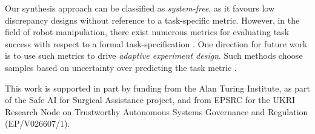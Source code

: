 \documentclass[sigplan, screen]{acmart} %
\begin{document}
Our synthesis approach can be classified as \emph{system-free}, as it favours low discrepancy designs without reference to a task-specific metric. However, in the field of robot manipulation, there exist numerous metrics for evaluating task success with respect to a formal task-specification \cite{mehdipour2019arithmetic, varnai2020robustness, haghighi2019control}. One direction for future work is to use such metrics to drive \emph{adaptive experiment design}. Such methods choose samples based on uncertainty over predicting the task metric \cite{eason2014adaptive}.

\begin{acks}
This work is supported in part by funding from the Alan Turing Institute, as part of the Safe AI for Surgical Assistance project, and from EPSRC for the UKRI Research Node on Trustworthy Autonomous Systems Governance and Regulation (EP/V026607/1).
\end{acks}





\end{document}

